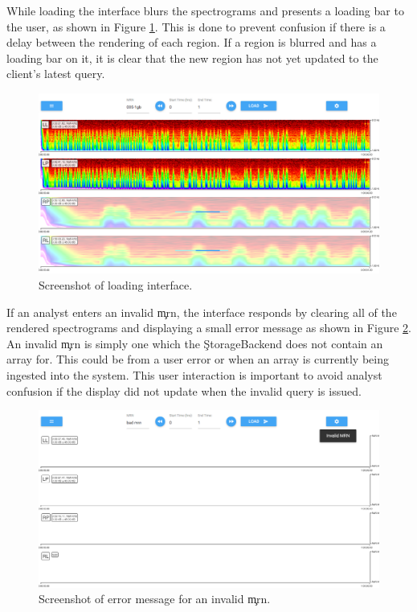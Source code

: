 While loading the interface blurs the spectrograms and presents a loading bar
to the user, as shown in Figure \ref{fig:loading}. This is done to
prevent confusion if there is a delay between the rendering of each region. If
a region is blurred and has a loading bar on it, it is clear that the new
region has not yet updated to the client's latest query. \\

\begin{figure}[h]
\begin{center}
\includegraphics[scale=0.35]{./img/loading.png}
\caption{Screenshot of loading interface.}
\label{fig:loading}
\end{center}
\end{figure}

If an analyst enters an invalid \c{mrn}, the interface responds by clearing all
of the rendered spectrograms and displaying a small error message as shown in
Figure \ref{fig:error}. An invalid \c{mrn} is simply one which the
\c{StorageBackend} does not contain an array for. This could be from a user
error or when an array is currently being ingested into the system. This user
interaction is important to avoid analyst confusion if the display did not
update when the invalid query is issued. \\

\begin{figure}[h]
\begin{center}
\includegraphics[scale=0.35]{./img/error.png}
\caption{Screenshot of error message for an invalid \c{mrn}.}
\label{fig:error}
\end{center}
\end{figure}

